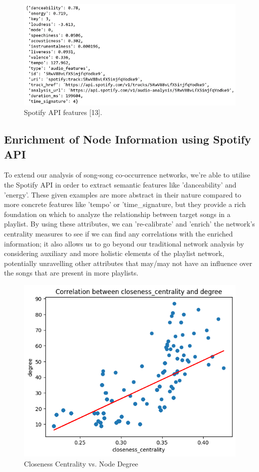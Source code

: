 \documentclass[conference]{IEEEtran}
\begin{document}
\begin{figure}[h!]
    \centering
    \includegraphics[width=1\linewidth]{images/spotify_data.png}
    \caption{Spotify API features [13].}
    \label{fig:enter-label}
\end{figure}

\subsection{Enrichment of Node Information using Spotify API}
To extend our analysis of song-song co-occurrence networks, we're able to utilise the Spotify API in order to extract semantic features like 'danceability' and 'energy'. These given examples are more abstract in their nature compared to more concrete features like 'tempo' or 'time{\_}signature, but they provide a rich foundation on which to analyze the relationship between target songs in a playlist. By using these attributes, we can 're-calibrate' and 'enrich' the network's centrality measures to see if we can find any correlations with the enriched information; it also allows us to go beyond our traditional network analysis by considering auxiliary and more holistic elements of the playlist network, potentially unravelling other attributes that may/may not have an influence over the songs that are present in more playlists. \\

\begin{figure}[h!]
    \centering
    \includegraphics[width=1\linewidth]{images/ccvsd.png}
    \caption{Closeness Centrality vs. Node Degree}
    \label{fig:enter-label}
\end{figure}
\end{document}
